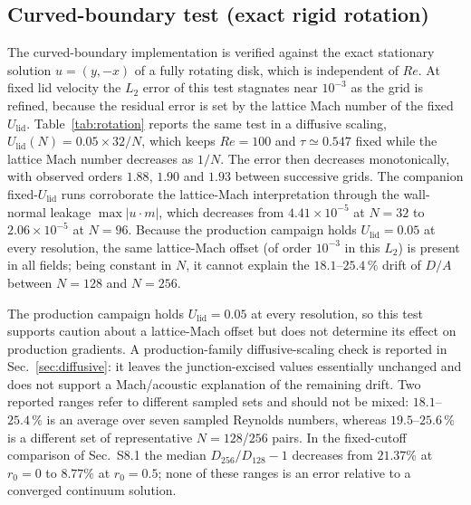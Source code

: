 \documentclass[11pt]{article}
\begin{document}
\subsection{Curved-boundary test (exact rigid rotation)}
The curved-boundary implementation is verified against the exact stationary
solution $u=(y,-x)$ of a fully rotating disk, which is independent of $Re$.
At fixed lid velocity the $L_2$ error of this test stagnates near $10^{-3}$ as
the grid is refined, because the residual error is set by the lattice Mach
number of the fixed $U_{\mathrm{lid}}$. Table~\ref{tab:rotation} reports the same
test in a diffusive scaling, $U_{\mathrm{lid}}(N)=0.05\times32/N$, which keeps
$Re=100$ and $\tau\simeq0.547$ fixed while the lattice Mach number decreases as
$1/N$. The error then decreases monotonically, with observed orders $1.88$,
$1.90$ and $1.93$ between successive grids. The companion
fixed-$U_{\mathrm{lid}}$ runs corroborate the lattice-Mach interpretation
through the wall-normal leakage $\max|u\cdot m|$, which decreases from
$4.41\times10^{-5}$ at $N=32$ to $2.06\times10^{-5}$ at $N=96$. \color{revred}Because the production campaign holds $U_{\mathrm{lid}}=0.05$ at every resolution, the same lattice-Mach offset (of order $10^{-3}$ in this $L_2$) is present in all fields; being constant in $N$, it cannot explain the $18.1$--$25.4\,\%$ drift of $D/A$ between $N=128$ and $N=256$.\par
\color{revblue}The production campaign holds $U_{\mathrm{lid}}=0.05$ at every resolution, so this test supports caution about a lattice-Mach offset but does not determine its effect on production gradients. A production-family diffusive-scaling check is reported in Sec.~\ref{sec:diffusive}: it leaves the junction-excised values essentially unchanged and does not support a Mach/acoustic explanation of the remaining drift. Two reported ranges refer to different sampled sets and should not be mixed: $18.1$--$25.4\,\%$ is an average over seven sampled Reynolds numbers, whereas $19.5$--$25.6\,\%$ is a different set of representative $N=128$/$256$ pairs. In the fixed-cutoff comparison of Sec.~S8.1 the median $D_{256}/D_{128}-1$ decreases from $21.37\%$ at $r_0=0$ to $8.77\%$ at $r_0=0.5$; none of these ranges is an error relative to a converged continuum solution.\par
\color{black}
\end{document}

